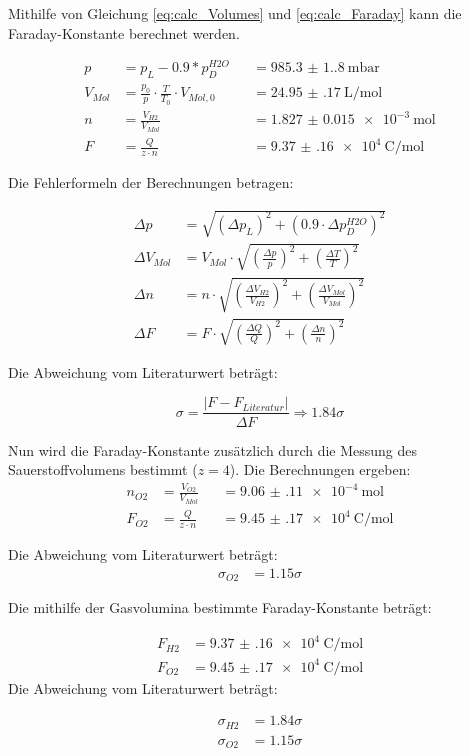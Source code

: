 \documentclass[12pt,a4paper,titlepage]{scrartcl}
\numberwithin{equation}{section}
\numberwithin{table}{section}
\numberwithin{figure}{section}
\begin{document}
Mithilfe von Gleichung \ref{eq:calc_Volumes} und \ref{eq:calc_Faraday} kann die Faraday-Konstante berechnet werden. 


\begin{align}
    p &= p_L - 0.9 * p_D^{H2O} &&= \qty{985.3(1.8)}{\milli\bar} \\
    V_{Mol} &= \frac{p_0}{p} \cdot \frac{T}{T_0} \cdot V_{Mol,0} &&= \qty{24.95(17)}{\liter\per\mol} \\
    n &= \frac{V_{H2}}{V_{Mol}} &&= \qty{1.827(15)e-3}{\mol} \\
    F &= \frac{Q}{z \cdot n} &&= \qty{9.37(16)e4}{\coulomb\per\mol}
\end{align}

Die Fehlerformeln der Berechnungen betragen:


\begin{align}
    \Delta p &= \sqrt{(\Delta p_L)^2 + (0.9 \cdot \Delta p_D^{H2O})^2} \\
    \Delta V_{Mol} &= V_{Mol} \cdot \sqrt{\left(\frac{\Delta p}{p}\right)^2 + \left(\frac{\Delta T}{T}\right)^2} \\
    \Delta n &= n \cdot \sqrt{\left(\frac{\Delta V_{H2}}{V_{H2}}\right)^2 + \left(\frac{\Delta V_{Mol}}{V_{Mol}}\right)^2} \\
    \Delta F &= F \cdot \sqrt{\left(\frac{\Delta Q}{Q}\right)^2 + \left(\frac{\Delta n}{n}\right)^2}
\end{align}

Die Abweichung vom Literaturwert beträgt:

\begin{equation}
    \sigma = \frac{|F - F_{Literatur}|}{\Delta F} \Rightarrow 1.84\sigma
\end{equation}


Nun wird die Faraday-Konstante zusätzlich durch die Messung des Sauerstoffvolumens bestimmt ($z=4$). Die Berechnungen ergeben:
\begin{align}
    n_{O2} &= \frac{V_{O2}}{V_{Mol}} &&= \qty{9.06(11)e-4}{\mol} \\
    F_{O2} &= \frac{Q}{z \cdot n} &&= \qty{9.45(17)e4}{\coulomb\per\mol}
\end{align}

Die Abweichung vom Literaturwert beträgt:
\begin{align}
        \sigma_{O2} &= 1.15\sigma    
\end{align}


\begin{resultbox}[Ergebnis]
    Die mithilfe der Gasvolumina bestimmte Faraday-Konstante beträgt:
    
\begin{align}
        F_{H2} &= \qty{9.37(16)e4}{\coulomb\per\mol}\\
        F_{O2} &= \qty{9.45(17)e4}{\coulomb\per\mol}
    \end{align}
    Die Abweichung vom Literaturwert beträgt:
    
\begin{align}
        \sigma_{H2} &= 1.84\sigma\\
        \sigma_{O2} &= 1.15\sigma
    \end{align}
\end{resultbox}
\end{document}
